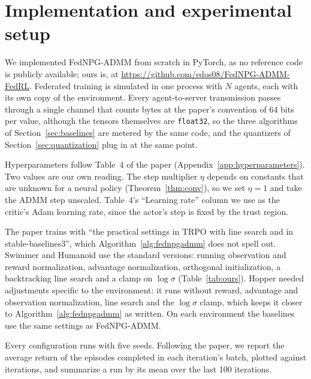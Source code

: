 \section{Implementation and experimental setup}
\label{sec:implementation}

We implemented FedNPG-ADMM from scratch in PyTorch, as no reference code is
publicly available; ours is, at \url{https://github.com/edos08/FedNPG-ADMM-FedRL}. Federated training is simulated in one process with $N$
agents, each with its own copy of the environment. Every agent-to-server
transmission passes through a single channel that counts bytes at the
paper's convention of 64 bits per value, although the tensors themselves
are \texttt{float32}, so the three algorithms of
Section~\ref{sec:baselines} are metered by the same code, and the quantizers
of Section~\ref{sec:quantization} plug in at the same point.

Hyperparameters follow Table~4 of the paper (Appendix~\ref{app:hyperparameters}).
Two values are our own reading. The step multiplier $\eta$ depends on
constants that are unknown for a neural policy (Theorem~\ref{thm:conv}), so we
set $\eta = 1$ and take the ADMM step unscaled. Table~4's ``Learning rate''
column we use as the critic's Adam learning rate, since the actor's step is
fixed by the trust region.

The paper trains with ``the practical settings in TRPO with line search and in
stable-baselines3'', which Algorithm~\ref{alg:fednpgadmm} does not spell out.
Swimmer and Humanoid use the standard versions: running observation and reward
normalization, advantage normalization, orthogonal initialization, a
backtracking line search and a clamp on $\log\sigma$ (Table~\ref{tab:ours}).
Hopper needed adjustments specific to the environment: it runs without
reward, advantage and observation normalization, line search and the
$\log\sigma$ clamp, which keeps it closer to Algorithm~\ref{alg:fednpgadmm}
as written. On each environment the baselines use the same settings as
FedNPG-ADMM.

Every configuration runs with five seeds. Following the paper, we report the
average return of the episodes completed in each iteration's batch, plotted
against iterations, and summarize a run by its mean over the last 100
iterations.

